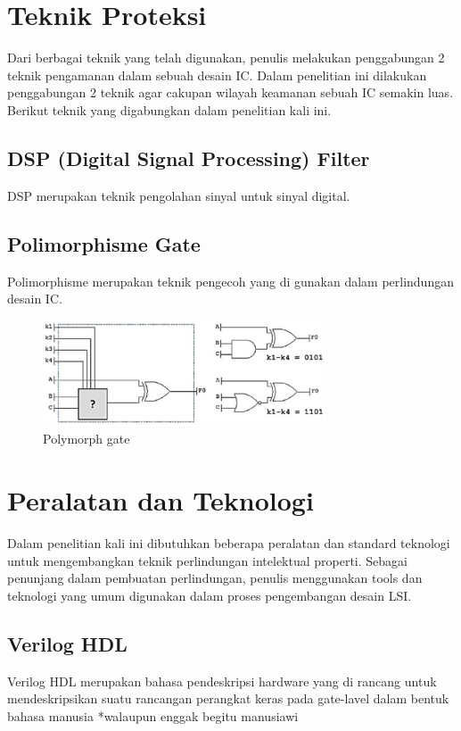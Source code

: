 \section{Teknik Proteksi}
Dari berbagai teknik yang telah digunakan, penulis melakukan penggabungan 2 teknik pengamanan dalam sebuah desain IC. Dalam penelitian ini dilakukan penggabungan 2 teknik agar cakupan wilayah keamanan sebuah IC semakin luas. Berikut teknik yang digabungkan dalam penelitian kali ini.

\subsection{DSP (Digital Signal Processing) Filter}
DSP merupakan teknik pengolahan sinyal untuk sinyal digital.

\subsection{Polimorphisme Gate}
Polimorphisme merupakan teknik pengecoh yang di gunakan dalam perlindungan desain IC. 

\begin{figure}
	\centering
	\includegraphics[width=0.75\textwidth]
	{pics/polymorphgate.png}
	\caption{Polymorph gate}
	\label{fig:poly}
\end{figure}

\section{Peralatan dan Teknologi}
Dalam penelitian kali ini dibutuhkan beberapa peralatan dan standard teknologi untuk mengembangkan teknik perlindungan intelektual properti. Sebagai penunjang dalam pembuatan perlindungan, penulis menggunakan tools dan teknologi yang umum digunakan dalam proses pengembangan desain LSI.

\subsection{Verilog HDL}
Verilog HDL merupakan bahasa pendeskripsi hardware yang di rancang untuk mendeskripsikan suatu rancangan perangkat keras pada gate-lavel dalam bentuk bahasa manusia *walaupun enggak begitu manusiawi

